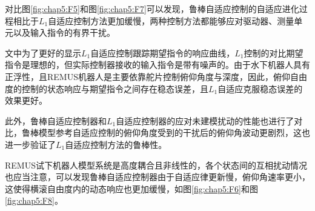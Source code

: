对比图\ref{fig:chap5:F5}和图\ref{fig:chap5:F7}可以发现，鲁棒自适应控制的自适应进化过程相比于$L_1$自适应控制方法更加缓慢，两种控制方法都能够应对驱动器、测量单元以及输入指令的有界干扰。

文中为了更好的显示$L_1$自适应控制跟踪期望指令的响应曲线，$L_1$控制的对比期望指令是理想的，但实际控制器接收的输入指令是带有噪声的。由于水下机器人具有正浮性，且REMUS机器人是主要依靠舵片控制俯仰角度与深度，因此，俯仰自由度的控制的状态响应与期望指令之间存在稳态误差，且$L_1$自适应克服稳态误差的效果更好。


此外，鲁棒自适应控制器和$L_1$自适应控制器的应对未建模扰动的性能也进行了对比，鲁棒模型参考自适应控制的俯仰角度受到的干扰后的俯仰角波动更剧烈，这也进一步验证了$L_1$自适应控制方法的鲁棒性。

REMUS试下机器人模型系统是高度耦合且非线性的，各个状态间的互相扰动情况也应当注意，可以发现鲁棒自适应控制器由于自适应律更新慢，俯仰角速率更小，这使得横滚自由度内的动态响应也更加缓慢，如图\ref{fig:chap5:F6}和图\ref{fig:chap5:F8}。

